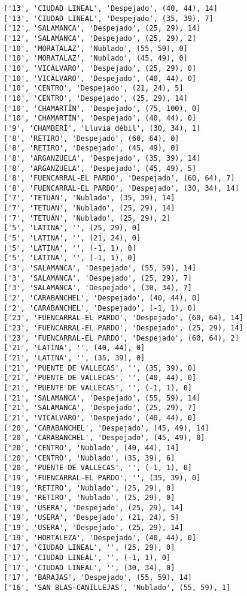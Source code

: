 \documentclass[11pt]{article}
\begin{document}
\begin{Verbatim}[commandchars=\\\{\}]
['13', 'CIUDAD LINEAL', 'Despejado', (40, 44), 14]
['13', 'CIUDAD LINEAL', 'Despejado', (35, 39), 7]
['12', 'SALAMANCA', 'Despejado', (25, 29), 14]
['12', 'SALAMANCA', 'Despejado', (25, 29), 2]
['10', 'MORATALAZ', 'Nublado', (55, 59), 0]
['10', 'MORATALAZ', 'Nublado', (45, 49), 0]
['10', 'VICÁLVARO', 'Despejado', (25, 29), 0]
['10', 'VICÁLVARO', 'Despejado', (40, 44), 0]
['10', 'CENTRO', 'Despejado', (21, 24), 5]
['10', 'CENTRO', 'Despejado', (25, 29), 14]
['10', 'CHAMARTÍN', 'Despejado', (75, 100), 0]
['10', 'CHAMARTÍN', 'Despejado', (40, 44), 0]
['9', 'CHAMBERÍ', 'Lluvia débil', (30, 34), 1]
['8', 'RETIRO', 'Despejado', (60, 64), 0]
['8', 'RETIRO', 'Despejado', (45, 49), 0]
['8', 'ARGANZUELA', 'Despejado', (35, 39), 14]
['8', 'ARGANZUELA', 'Despejado', (45, 49), 5]
['8', 'FUENCARRAL-EL PARDO', 'Despejado', (60, 64), 7]
['8', 'FUENCARRAL-EL PARDO', 'Despejado', (30, 34), 14]
['7', 'TETUÁN', 'Nublado', (35, 39), 14]
['7', 'TETUÁN', 'Nublado', (25, 29), 14]
['7', 'TETUÁN', 'Nublado', (25, 29), 2]
['5', 'LATINA', '', (25, 29), 0]
['5', 'LATINA', '', (21, 24), 0]
['5', 'LATINA', '', (-1, 1), 0]
['5', 'LATINA', '', (-1, 1), 0]
['3', 'SALAMANCA', 'Despejado', (55, 59), 14]
['3', 'SALAMANCA', 'Despejado', (25, 29), 7]
['3', 'SALAMANCA', 'Despejado', (30, 34), 7]
['2', 'CARABANCHEL', 'Despejado', (40, 44), 0]
['2', 'CARABANCHEL', 'Despejado', (-1, 1), 0]
['23', 'FUENCARRAL-EL PARDO', 'Despejado', (60, 64), 14]
['23', 'FUENCARRAL-EL PARDO', 'Despejado', (25, 29), 14]
['23', 'FUENCARRAL-EL PARDO', 'Despejado', (60, 64), 2]
['21', 'LATINA', '', (40, 44), 0]
['21', 'LATINA', '', (35, 39), 0]
['21', 'PUENTE DE VALLECAS', '', (35, 39), 0]
['21', 'PUENTE DE VALLECAS', '', (40, 44), 0]
['21', 'PUENTE DE VALLECAS', '', (-1, 1), 0]
['21', 'SALAMANCA', 'Despejado', (55, 59), 14]
['21', 'SALAMANCA', 'Despejado', (25, 29), 7]
['21', 'VICÁLVARO', 'Despejado', (40, 44), 0]
['20', 'CARABANCHEL', 'Despejado', (45, 49), 14]
['20', 'CARABANCHEL', 'Despejado', (45, 49), 0]
['20', 'CENTRO', 'Nublado', (40, 44), 14]
['20', 'CENTRO', 'Nublado', (35, 39), 6]
['20', 'PUENTE DE VALLECAS', '', (-1, 1), 0]
['19', 'FUENCARRAL-EL PARDO', '', (35, 39), 0]
['19', 'RETIRO', 'Nublado', (25, 29), 0]
['19', 'RETIRO', 'Nublado', (25, 29), 0]
['19', 'USERA', 'Despejado', (25, 29), 14]
['19', 'USERA', 'Despejado', (21, 24), 5]
['19', 'USERA', 'Despejado', (25, 29), 14]
['19', 'HORTALEZA', 'Despejado', (40, 44), 0]
['17', 'CIUDAD LINEAL', '', (25, 29), 0]
['17', 'CIUDAD LINEAL', '', (-1, 1), 0]
['17', 'CIUDAD LINEAL', '', (30, 34), 0]
['17', 'BARAJAS', 'Despejado', (55, 59), 14]
['16', 'SAN BLAS-CANILLEJAS', 'Nublado', (55, 59), 1]

\end{Verbatim}
\end{document}
